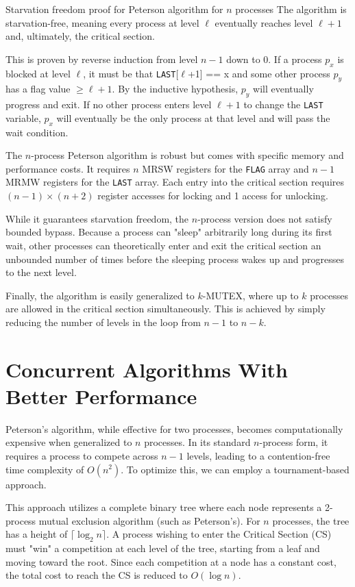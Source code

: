 \begin{Lemma}{Starvation freedom proof for Peterson algorithm for $n$ processes}{}
The algorithm is starvation-free, meaning every process at level $\ell$ eventually reaches level $\ell+1$ and, ultimately, the critical section. 
\begin{demonstration}
This is proven by reverse induction from level $n-1$ down to 0. If a process $p_x$ is blocked at level $\ell$, it must be that \texttt{LAST}[$\ell$+1] == x and some other process $p_y$ has a flag value $\geq\ell+1$. By the inductive hypothesis, $p_y$ will eventually progress and exit. If no other process enters level $\ell+1$ to change the \texttt{LAST} variable, $p_x$ will eventually be the only process at that level and will pass the wait condition.
\end{demonstration}
\end{Lemma}

The $n$-process Peterson algorithm is robust but comes with specific memory and performance costs. It requires $n$ MRSW registers for the \texttt{FLAG} array and $n-1$ MRMW registers for the \texttt{LAST} array. Each entry into the critical section requires $(n-1)\times(n+2)$ register accesses for locking and 1 access for unlocking.

While it guarantees starvation freedom, the $n$-process version does not satisfy bounded bypass. Because a process can "sleep" arbitrarily long during its first wait, other processes can theoretically enter and exit the critical section an unbounded number of times before the sleeping process wakes up and progresses to the next level.

Finally, the algorithm is easily generalized to $k$-MUTEX, where up to $k$ processes are allowed in the critical section simultaneously. This is achieved by simply reducing the number of levels in the loop from $n-1$ to $n-k$.

\section{Concurrent Algorithms With Better Performance}
Peterson’s algorithm, while effective for two processes, becomes computationally expensive when generalized to $n$ processes. In its standard $n$-process form, it requires a process to compete across $n-1$ levels, leading to a contention-free time complexity of $O(n^2)$. To optimize this, we can employ a tournament-based approach.

This approach utilizes a complete binary tree where each node represents a 2-process mutual exclusion algorithm (such as Peterson’s). For $n$ processes, the tree has a height of $\lceil\log_2{n}\rceil$. A process wishing to enter the Critical Section (CS) must "win" a competition at each level of the tree, starting from a leaf and moving toward the root. Since each competition at a node has a constant cost, the total cost to reach the CS is reduced to $O(\log{n})$.

